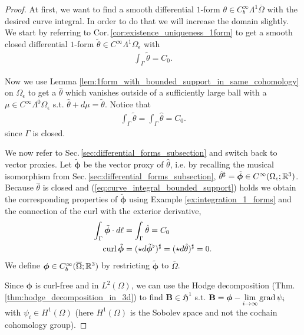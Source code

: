 \documentclass[../master_thesis.tex]{subfiles}
\begin{document}
\begin{proof}
    At first, we want to find a smooth differential $1$-form 
    $\theta \in C_b^\infty\Lambda^1 \overline{\Omega}$ with the desired curve integral. 
    In order to do that we will increase the 
    domain slightly.
    We start by referring to Cor.\,\ref{cor:existence_uniqueness_1form} 
    to get a smooth closed differential $1$-form 
    $\tilde{\theta} \in C^\infty\Lambda^1 \Omega_\epsilon$ with 
    \begin{align}
        \int_\Gamma \tilde{\theta} = C_0. \label{eq:integral_theta_tilde}
    \end{align}

    Now we use Lemma \ref{lem:1form_with_bounded_support_in_same_cohomology} 
    on $\Omega_\epsilon$ to get a $\hat{\theta}$ which vanishes 
    outside of a sufficiently large ball with a $\mu \in C^\infty\Lambda^0 \Omega_\epsilon$ s.t. 
    $\hat{\theta} + d\mu= \tilde{\theta}$. Notice that
    \begin{align}
        \int_\Gamma \tilde{\theta} = \int_\Gamma \hat{\theta} = C_0. \label{eq:curve_integral_bounded_support}
    \end{align}
    since $\Gamma$ is closed. 
    
    We now refer to Sec.\,\ref{sec:differential_forms_subsection} 
    and switch back to vector proxies. Let 
    $\tilde{\bm{\phi}}$ be the vector proxy of $\hat{\theta}$, 
    i.e. by recalling the musical isomorphism from Sec.\,\ref{sec:differential_forms_subsection},
    $\hat{\theta}^\sharp = \tilde{\bm{\phi}} \in C^\infty(\Omega_\epsilon;\mathbb{R}^3)$.
    Because $\hat{\theta}$ is closed and (\ref{eq:curve_integral_bounded_support}) holds
    we obtain the corresponding properties 
    of $\tilde{\bm{\phi}}$ using Example \ref{ex:integration_1_forms} and the connection 
    of the curl with the exterior derivative,
    \begin{align*}
        \int_\Gamma \tilde{\bm{\phi}} \cdot d\ell &= \int_\Gamma \hat{\theta} = C_0 
        \\ \operatorname{curl} \tilde{\bm{\phi}} &= (\star d\tilde{\bm{\phi}}^\flat)^\sharp = 
        (\star d\hat{\theta})^\sharp = 0.
    \end{align*}
    We define $\bm{\phi} \in C_b^\infty(\overline{\Omega};\mathbb{R}^3)$ by restricting $\tilde{\bm{\phi}}$ 
    to $\overline{\Omega}$. 

    Since $\bm{\phi}$ is curl-free and in $L^2(\Omega)$, we can use the Hodge decomposition 
    (Thm. \ref{thm:hodge_decomposition_in_3d}) to find $\mathbf{B} \in \mathfrak{H}^1$ s.t.
    $\mathbf{B} = \bm{\phi} - \lim\limits_{i\rightarrow \infty}\operatorname{grad} \psi_i$ 
    with $\psi_i \in H^1(\Omega)$ (here $H^1(\Omega)$ is the Sobolev space and not the cochain 
    cohomology group).


\end{proof}
\end{document}
